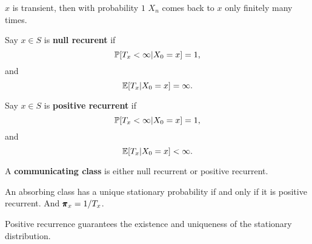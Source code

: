 \begin{remark}
    $x$ is transient, then with probability $1$ $X_n$ comes back to $x$ only finitely many times.
\end{remark}

\begin{definition}
    Say $x \in S$ is \textbf{null recurent} if 
$$
\mathbb{P} [T_x < \infty | X_0 = x] = 1,
$$
and 
$$
\mathbb{E} [T_x | X_0 = x] = \infty.
$$
\end{definition}

\begin{definition}
    Say $x \in S$ is \textbf{positive recurrent} if 
$$
\mathbb{P} [T_x < \infty | X_0 = x] = 1,
$$
and 
$$
\mathbb{E} [T_x | X_0 = x] < \infty.
$$
\end{definition}

\begin{definition}
    A \textbf{communicating class} is either null recurrent or positive recurrent. 
\end{definition}

\begin{theorem}
    An absorbing class has a unique stationary probability if and only if it is positive recurrent. And $\pmb{\pi}_x = 1/T_x$.
\end{theorem}

\begin{remark}
    Positive recurrence guarantees the existence and uniqueness of the stationary distribution.
\end{remark}
